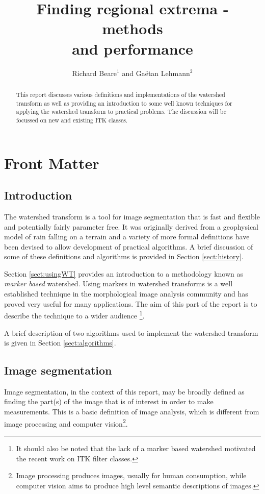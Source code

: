 \documentclass{InsightArticle}
\title{Finding regional extrema - methods\\ and performance}
\author{Richard Beare{$^1$} {\small{and}} Ga\"etan Lehmann{$^2$}}
\begin{document}
\maketitle

\ifhtml
\chapter*{Front Matter\label{front}}
\fi


\begin{abstract}
\noindent
This report discusses various definitions and implementations of the
watershed transform as well as providing an introduction to some well
known techniques for applying the watershed transform to practical
problems. The discussion will be focussed on new and existing ITK
classes.
\end{abstract}

\tableofcontents
\section{Introduction}
The watershed transform is a tool for image segmentation that is fast
and flexible and potentially fairly parameter free. It was originally
derived from a geophysical model of rain falling on a terrain and a variety
of more formal definitions have been devised to allow development of
practical algorithms. A brief discussion of some of these definitions
and algorithms is provided in Section \ref{sect:history}. 

Section \ref{sect:usingWT} provides an introduction to a
methodology known as {\em marker based} watershed. Using markers in
watershed transforms is a well established technique in the
morphological image analysis community and has proved very useful for
many applications. The aim of this part of the report is to describe
the technique to a wider audience \footnote{It should also be noted
that the lack of a marker based watershed motivated the recent work on
ITK filter classes.}.

A brief description of two algorithms used to implement the watershed
transform is given in Section \ref{sect:algorithms}.

\section{Image segmentation}
Image segmentation, in the context of this report, may be broadly
defined as finding the part(s) of the image that is of interest in
order to make measurements. This is a basic definition of image
analysis, which is different from image processing and computer
vision\footnote{Image processing produces images, usually for human
consumption, while computer vision aims to produce high level semantic
descriptions of images.}.
\end{document}
